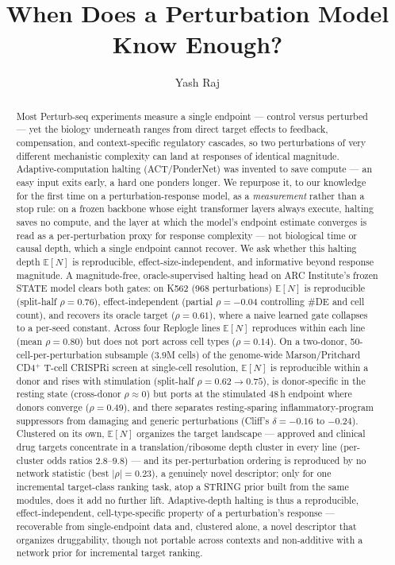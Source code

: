 \documentclass[11pt]{article}
\title{\textbf{When Does a Perturbation Model Know Enough?}}
\author{Yash Raj}
\date{}
\newcommand{\EN}{\ensuremath{\mathbb{E}[N]}}
\let\mathrho\rho
\renewcommand{\rho}{\ensuremath{\mathrho}}
\begin{document}
\maketitle

\begin{abstract}
\noindent
Most Perturb-seq experiments measure a single endpoint --- control versus perturbed --- yet the
biology underneath ranges from direct target effects to feedback, compensation, and
context-specific regulatory cascades, so two perturbations of very different mechanistic complexity
can land at responses of identical magnitude. Adaptive-computation halting (ACT/PonderNet) was
invented to save compute --- an easy input exits early, a hard one ponders longer. We repurpose it,
to our knowledge for the first time on a perturbation-response model, as a \emph{measurement} rather
than a stop rule: on a frozen backbone whose eight transformer layers always execute, halting saves
no compute, and the layer at which the model's endpoint estimate converges is read as a
per-perturbation proxy for response complexity --- not biological time or causal depth, which a
single endpoint cannot recover. We ask whether this halting depth \EN{} is reproducible,
effect-size-independent, and informative beyond response magnitude. A magnitude-free,
oracle-supervised halting head on ARC Institute's frozen STATE model clears both gates: on K562
(968 perturbations) \EN{} is reproducible (split-half \rho{}$=0.76$), effect-independent
(partial \rho{}$=-0.04$ controlling \#DE and cell count), and recovers its oracle target
(\rho{}$=0.61$), where a naive learned gate collapses to a per-seed constant. Across four Replogle
lines \EN{} reproduces within each line (mean \rho{}$=0.80$) but does not port across cell types
(\rho{}$=0.14$). On a two-donor, 50-cell-per-perturbation subsample ($3.9$M cells) of the
genome-wide Marson/Pritchard CD4$^+$ T-cell CRISPRi screen at single-cell resolution, \EN{} is
reproducible within a donor and rises with stimulation (split-half \rho{}$=0.62\to0.75$), is
donor-specific in the resting state (cross-donor \rho{}$\approx0$) but ports at the stimulated 48\,h
endpoint where donors converge (\rho{}$=0.49$), and there separates resting-sparing
inflammatory-program suppressors from damaging and generic perturbations (Cliff's
$\delta=-0.16$ to $-0.24$). Clustered on its own, \EN{} organizes the target landscape ---
approved and clinical drug targets concentrate in a translation/ribosome depth cluster in every
line (per-cluster odds ratios $2.8$--$9.8$) --- and its per-perturbation ordering is reproduced by
no network statistic (best $|\rho|=0.23$), a genuinely novel descriptor; only for one incremental
target-class ranking task, atop a STRING prior built from the same modules, does it add no further
lift. Adaptive-depth halting is thus a reproducible, effect-independent, cell-type-specific property
of a perturbation's response --- recoverable from single-endpoint data and, clustered alone, a novel
descriptor that organizes druggability, though not portable across contexts and non-additive with a
network prior for incremental target ranking.
\end{abstract}
\end{document}
